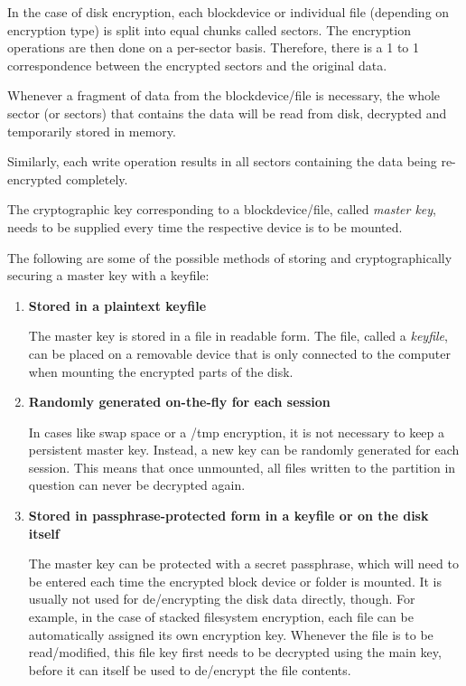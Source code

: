 In the case of disk encryption, each blockdevice or individual file (depending on encryption type) is split into equal chunks called sectors. The encryption operations are then done on a per-sector basis. Therefore, there is a 1 to 1 correspondence between the encrypted sectors and the original data.

Whenever a fragment of data from the blockdevice/file is necessary, the whole sector (or sectors) that contains the data will be read from disk, decrypted and temporarily stored in memory.

Similarly, each write operation results in all sectors containing the data being re-encrypted completely.

The cryptographic key corresponding to a blockdevice/file, called \textit{master key}, needs to be supplied every time the respective device is to be mounted.

The following are some of the possible methods of storing and cryptographically securing a master key with a keyfile\cite{disk-enc}:
\begin{enumerate}
\item \textbf{Stored in a plaintext keyfile}

The master key is stored in a file in readable form. The file, called a \textit{keyfile}, can be placed on a removable device that is only connected to the computer when mounting the encrypted parts of the disk.

\item \textbf{Randomly generated on-the-fly for each session}

In cases like swap space or a /tmp encryption, it is not necessary to keep a persistent master key. Instead, a new key can be randomly generated for each session. This means that once unmounted, all files written to the partition in question can never be decrypted again.

\item \textbf{Stored in passphrase-protected form in a keyfile or on the disk itself}

The master key can be protected with a secret passphrase, which will need to be entered each time the encrypted block device or folder is mounted.
It is usually not used for de/encrypting the disk data directly, though. For example, in the case of stacked filesystem encryption, each file can be automatically assigned its own encryption key. Whenever the file is to be read/modified, this file key first needs to be decrypted using the main key, before it can itself be used to de/encrypt the file contents.

\end{enumerate}

